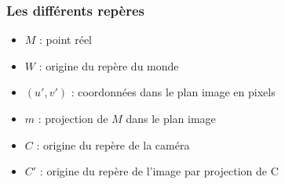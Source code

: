 \begin{frame}
    \label{moravec-code}
\end{frame}


\begin{frame}
  \label{projection-appendix}
\frametitle{Les différents repères}

\begin{minipage}[c]{0.48\linewidth}
  \centering
  \begin{overlayarea}{0.9\linewidth}{4cm}
    \hspace*{-1cm}
  \end{overlayarea}
\end{minipage}
\hfill
\begin{minipage}[c]{0.48\linewidth}
  \vspace*{\fill}
  \begin{itemize}
    \item<2-> $M$ : point réel
    \item<3-> $W$ : origine du repère du monde
    \item<4-> $(u', v')$ : coordonnées dans le plan image en pixels
    \item<5-> $m$ : projection de $M$ dans le plan image
    \item<6-> $C$ : origine du repère de la caméra
    \item<8-> $C'$ : origine du repère de l'image par projection de C
  \end{itemize}
  \vspace*{\fill}
\end{minipage}
\end{frame}

